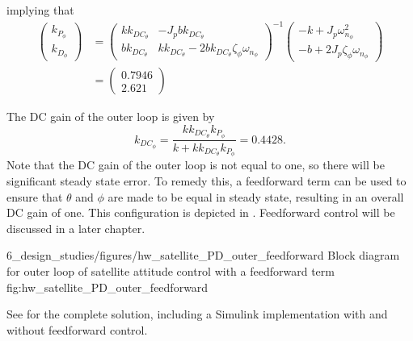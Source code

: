 implying that
\begin{align*}
\begin{pmatrix}k_{P_\phi}\\k_{D_\phi}\end{pmatrix} &= \begin{pmatrix} kk_{DC_\theta} & -J_pbk_{DC_\theta} \\ bk_{DC_\theta} & kk_{DC_\theta}-2bk_{DC_\theta}\zeta_\phi\omega_{n_\phi} \end{pmatrix}^{-1} 
	\begin{pmatrix} -k + J_p\omega_{n_\phi}^2 \\ -b + 2J_p\zeta_\phi\omega_{n_\phi} \end{pmatrix} \\
	&= \begin{pmatrix} 0.7946 \\ 2.621 \end{pmatrix}
\end{align*}

The DC gain of the outer loop is given by
\[
k_{DC_{\phi}} = \frac{kk_{DC_\theta}k_{P_\phi}}{k+kk_{DC_\theta}k_{P_\phi}} = 0.4428.
\]
Note that the DC gain of the outer loop is not equal to one, so there will be significant steady state error. To remedy this, a feedforward term can be used to ensure that $\theta$ and $\phi$ are made to be equal in steady state, resulting in an overall DC gain of one. This configuration is depicted in . Feedforward control will be discussed in a later chapter.

	{6_design_studies/figures/hw_satellite_PD_outer_feedforward}
	{Block diagram for outer loop of satellite attitude control with a feedforward term}
	{fig:hw_satellite_PD_outer_feedforward}

See  for the complete solution, including a Simulink implementation with and without feedforward control.
